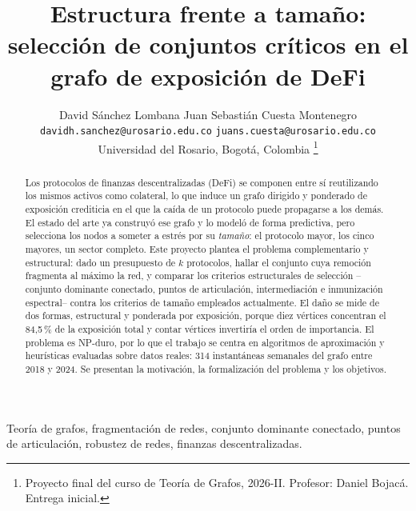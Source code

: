 \documentclass[journal]{IEEEtran}
\begin{document}
\title{Estructura frente a tamaño: selección de conjuntos críticos
en el grafo de exposición de DeFi}

\author{David Sánchez Lombana \quad Juan Sebastián Cuesta Montenegro\\[2pt]
{\small\texttt{davidh.sanchez@urosario.edu.co} \quad
\texttt{juans.cuesta@urosario.edu.co}}\\[2pt]
{\small Universidad del Rosario, Bogotá, Colombia}%
\thanks{Proyecto final del curso de Teoría de Grafos, 2026-II.
Profesor: Daniel Bojacá. Entrega inicial.}}

\pagestyle{plain}

\maketitle

\begin{abstract}
Los protocolos de finanzas descentralizadas (DeFi) se componen entre sí
reutilizando los mismos activos como colateral, lo que induce un grafo dirigido
y ponderado de exposición crediticia en el que la caída de un protocolo puede
propagarse a los demás. El estado del arte ya construyó ese grafo y lo modeló
de forma predictiva, pero selecciona los nodos a someter a estrés por su
\emph{tamaño}: el protocolo mayor, los cinco mayores, un sector completo.
Este proyecto plantea el problema complementario y estructural: dado un
presupuesto de $k$ protocolos, hallar el conjunto cuya remoción fragmenta al
máximo la red, y comparar los criterios estructurales de selección --conjunto
dominante conectado, puntos de articulación, intermediación e inmunización
espectral-- contra los criterios de tamaño empleados actualmente. El daño se
mide de dos formas, estructural y ponderada por exposición, porque diez vértices
concentran el 84{,}5\,\% de la exposición total y contar vértices invertiría el
orden de importancia.
El problema es NP-duro, por lo que el trabajo se centra en algoritmos de
aproximación y heurísticas evaluadas sobre datos reales: 314 instantáneas
semanales del grafo entre 2018 y 2024. Se presentan la motivación, la
formalización del problema y los objetivos.
\end{abstract}

\begin{IEEEkeywords}
Teoría de grafos, fragmentación de redes, conjunto dominante conectado,
puntos de articulación, robustez de redes, finanzas descentralizadas.
\end{IEEEkeywords}
\end{document}
